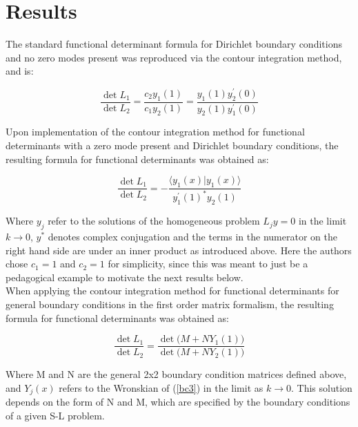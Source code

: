 \documentclass[12]{article}
\begin{document}
\section{Results}

The standard functional determinant formula for Dirichlet boundary conditions and no zero modes present was reproduced via the contour integration method, and is:

\begin{equation} \label{solution2}
    \frac{\det{L_1}}{\det{L_2}} = \frac{c_2y_1(1)}{c_1y_2(1)} = \frac{y_1(1)y^{'}_2(0)}{y_2(1)y^{'}_1(0)}
\end{equation} 

Upon implementation of the contour integration method for functional determinants with a zero mode present and Dirichlet boundary conditions, the resulting formula for functional determinants was obtained as: 

\begin{equation} \label{Dirichletzeromodesolution}
   \frac{\det{L_1}}{\det{L_2}} = -\frac{\langle y_1(x)|y_1(x)\rangle}{y^{'}_1(1)^{*}y_2(1)}
\end{equation}

Where \(y_j\) refer to the solutions of the homogeneous problem \(L_jy = 0\) in the limit \( k \longrightarrow 0\), \(y^{*}\) denotes complex conjugation and the terms in the numerator on the right hand side are under an inner product as introduced above. Here the authors chose \(c_1 = 1\) and \(c_2 = 1\) for simplicity, since this was meant to just be a pedagogical example to motivate the next results below. \\


When applying the contour integration method for functional determinants for general boundary conditions in the first order matrix formalism, the resulting formula for functional determinants was obtained as: 

\begin{equation} \label{genboundssolution}
   \frac{\det{L_1}}{\det{L_2}} = \frac{\det{(M+NY_1(1)})}{\det{(M + NY_2(1)})}
\end{equation} 
   
Where M and N are the general 2x2 boundary condition matrices defined above, and \(Y_j(x)\) refers to the Wronskian of (\ref{bc3}) in the limit as \( k \longrightarrow 0\). This solution depends on the form of N and M, which are specified by the boundary conditions of a given S-L problem. \\
\end{document}
